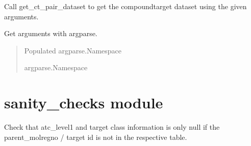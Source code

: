 \documentclass[letterpaper,10pt,english]{sphinxmanual}
\begin{document}
\begin{fulllineitems}
\label{\detokenize{main:main.main}}
\pysigstartsignatures
{}
\pysigstopsignatures
\sphinxAtStartPar
Call get\_ct\_pair\_dataset to get the compound\sphinxhyphen{}target dataset using the given arguments.

\end{fulllineitems}


\begin{fulllineitems}
\label{\detokenize{main:main.parse_args}}
\pysigstartsignatures
{}
\pysigstopsignatures
\sphinxAtStartPar
Get arguments with argparse.
\begin{quote}\begin{description}
\sphinxAtStartPar
Populated argparse.Namespace

\sphinxAtStartPar
argparse.Namespace

\end{description}\end{quote}

\end{fulllineitems}


\sphinxstepscope


\section{sanity\_checks module}
\label{\detokenize{sanity_checks:module-sanity_checks}}\label{\detokenize{sanity_checks:sanity-checks-module}}\label{\detokenize{sanity_checks::doc}}

\begin{fulllineitems}
\label{\detokenize{sanity_checks:sanity_checks.check_atc_and_target_classes}}
\pysigstartsignatures
{}
\pysigstopsignatures
\sphinxAtStartPar
Check that atc\_level1 and target class information is only null
if the parent\_molregno / target id is not in the respective table.

\end{fulllineitems}
\end{document}

